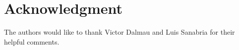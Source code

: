 \documentclass[journal]{IEEEtran}
\begin{document}
%
%
%
%


\section*{Acknowledgment}


The authors would like to thank Victor Dalmau and Luis Sanabria for their helpful comments.
\end{document}
